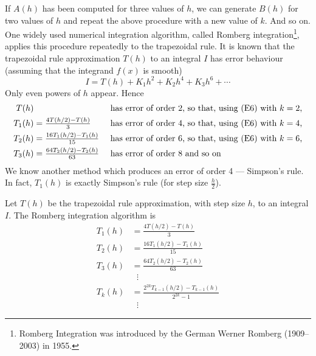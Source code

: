 If $A(h)$ has been computed for three values of $h$, we can generate $B(h)$
for two values of $h$ and repeat the above procedure with a new value of
$k$. And so on.
One widely used numerical integration algorithm,
called Romberg integration\footnote{Romberg Integration
was introduced by the German Werner Romberg (1909--2003) in
1955.}, applies this procedure repeatedly to the
trapezoidal rule. It is known that the trapezoidal rule approximation
$T(h)$ to an integral $I$ has error behaviour (assuming that the integrand
$f(x)$ is smooth)
\begin{equation*}
I=T(h)+K_1h^2+K_2h^4+K_3h^6+\cdots
\end{equation*}
Only even powers of $h$ appear.
Hence
\begin{align*}
T(h)&                         &&\hbox{ has error of order 2, so that,
using (E6) with $k=2$,}\\
T_1(h)&=\tfrac{4T(h/2)-T(h)}{3}&&\hbox{ has error of order 4, so that,
using (E6) with $k=4$,}\\
T_2(h)&=\tfrac{16T_1(h/2)-T_1(h)}{15}&&\hbox{ has error of order 6, so that,
using (E6) with $k=6$,}\\
T_3(h)&=\tfrac{64T_2(h/2)-T_2(h)}{63}&&\hbox{ has error of order 8 and so on}
\end{align*}
We know another method which produces an error of order 4 --- Simpson's
rule. In fact, $T_1(h)$ is exactly Simpson's rule (for step size
$\tfrac{h}{2}$).

\begin{impeqn}\label{eq:Romberg}
Let $T(h)$ be the trapezoidal rule approximation, with step size $h$, 
to an integral $I$. The Romberg integration algorithm is 
\begin{align*}
T_1(h)&=\tfrac{4T(h/2)-T(h)}{3} \\
T_2(h)&=\tfrac{16T_1(h/2)-T_1(h)}{15} \\
T_3(h)&=\tfrac{64T_2(h/2)-T_2(h)}{63} \\
&\ \ \, \vdots \\
T_k(h)&=\tfrac{2^{2k} T_{k-1}(h/2)-T_{k-1}(h)}{2^{2k}-1} \\
&\ \ \, \vdots
\end{align*}
\end{impeqn}


